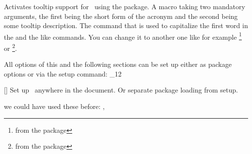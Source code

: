 \documentclass[load-preamble+]{cnltx-doc}
\makeatletter
\renewenvironment{commands}
  {%
    \cnltx@set@catcode_{12}%
    \let\command\cnltx@command
    \cnltxlist
  }
  {\endcnltxlist}
\makeatother
\begin{document}
\begin{options}
    Activates tooltip support for \acro\ using the
     package.
    A macro taking two mandatory arguments, the first being
    the short form of the acronym and the second being some tooltip
    description.
    The command that is used to capitalize the first word in the  and
    the like commands.  You can change it to another one like for example
    \footnote{from the  package} or
    \footnote{from the  package}.
\end{options}
 
All options of this and the following sections can be set up either as package
options or via the setup command:
\begin{commands}
  \command{acsetup}[]
   Set up \acro\ anywhere in the document.  Or separate package loading from
   setup.
\end{commands}

\begin{example}
  we could have used these before: \nato, \ny
\end{example}
\end{document}
